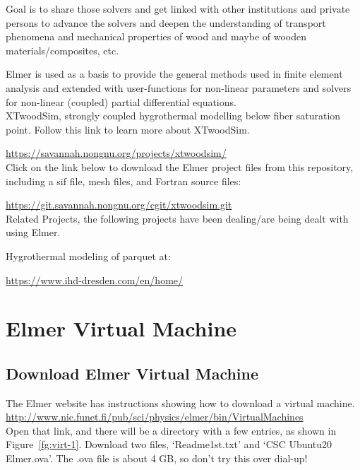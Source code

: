 Goal is to share those solvers and get linked with other institutions and private persons to advance the solvers and deepen the understanding of transport phenomena and mechanical properties of wood and maybe of wooden materials/composites, etc.

Elmer is used as a basis to provide the general methods used in finite element analysis and extended with user-functions for non-linear parameters and solvers for non-linear (coupled) partial differential equations.\\

\noindent XTwoodSim, strongly coupled hygrothermal modelling below fiber saturation point.  Follow this link to learn more about XTwoodSim.

    \url{https://savannah.nongnu.org/projects/xtwoodsim/}\\

Click on the link below to download the Elmer project files from this repository, including a sif file, mesh files, and Fortran source files:

\url{https://git.savannah.nongnu.org/cgit/xtwoodsim.git}\\

\noindent Related Projects, the following projects have been dealing/are being dealt with using Elmer.

    Hygrothermal modeling of parquet at:

\url{https://www.ihd-dresden.com/en/home/}


\chapter{Elmer Virtual Machine}

\section{Download Elmer Virtual Machine}

The Elmer website has instructions showing how to download a virtual machine.\\

 \url{http://www.nic.funet.fi/pub/sci/physics/elmer/bin/VirtualMachines}\\

Open that link, and there will be a directory with a few entries, as shown in Figure~\ref{fg:virt-1}.  Download two files, `Readme1st.txt' and  `CSC Ubuntu20 Elmer.ova'.  The .ova file is about 4 GB, so don't try this over dial-up!\\


